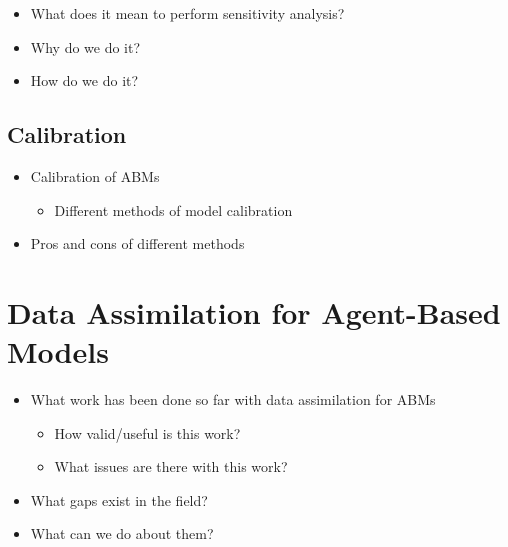 \documentclass[11pt,a4paper]{article}
\begin{document}
\begin{itemize}
    \item What does it mean to perform sensitivity analysis?
    \item Why do we do it?
    \item How do we do it? \citep{thiele2014facilitating,ten2016sensitivity}
\end{itemize}

\subsection{Calibration}
\label{sub:analysis:calibration}

\begin{itemize}
    \item Calibration of ABMs
        \begin{itemize}
            \item Different methods of model calibration
                \citep{thiele2014facilitating}
        \end{itemize}
    \item Pros and cons of different methods
\end{itemize}

\section{Data Assimilation for Agent-Based Models}
\label{sec:dyn_cal}

\begin{itemize}
    \item What work has been done so far with data assimilation for ABMs
        \citep{ward2016dynamic,wang2015data}
        \begin{itemize}
            \item How valid/useful is this work?
            \item What issues are there with this work?
        \end{itemize}
    \item What gaps exist in the field?
    \item What can we do about them?
\end{itemize}



\label{bib}
\end{document}
